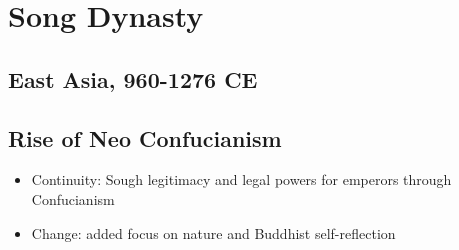 \chapter{Song Dynasty}\label{ch:song}
\section*{East Asia, 960-1276 CE}
\section{Rise of Neo Confucianism}
\begin{itemize}
    \item Continuity: Sough legitimacy and legal powers for emperors through Confucianism
    \item Change: added  focus on nature and Buddhist self-reflection
\end{itemize}


